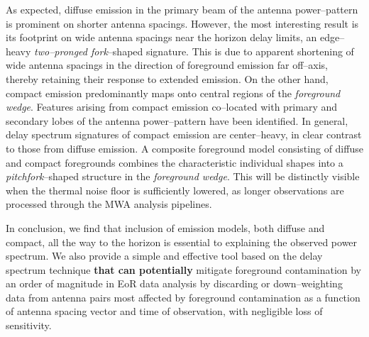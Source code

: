 \documentclass[preprint2,iop,numberedappendix]{emulateapj}
\begin{document}
As expected, diffuse emission in the primary beam of the antenna power--pattern is prominent on shorter antenna spacings. However, the most interesting result is its footprint on wide antenna spacings near the horizon delay limits, an edge--heavy {\it two--pronged fork}--shaped signature. This is due to apparent shortening of wide antenna spacings in the direction of foreground emission far off--axis, thereby retaining their response to extended emission. On the other hand, compact emission predominantly maps onto central regions of the {\it foreground wedge}. Features arising from compact emission co--located with primary and secondary lobes of the antenna power--pattern have been identified. In general, delay spectrum signatures of compact emission are center--heavy, in clear contrast to those from diffuse emission. A composite foreground model consisting of diffuse and compact foregrounds combines the characteristic individual shapes into a {\it pitchfork}--shaped structure in the {\it foreground wedge}. This will be distinctly visible when the thermal noise floor is sufficiently lowered, as longer observations are processed through the MWA analysis pipelines.

In conclusion, we find that inclusion of emission models, both diffuse and compact, all the way to the horizon is essential to explaining the observed power spectrum. We also provide a simple and effective tool based on the delay spectrum technique {\bf that can potentially} mitigate foreground contamination by an order of magnitude in EoR data analysis by discarding or down--weighting data from antenna pairs most affected by foreground contamination as a function of antenna spacing vector and time of observation, with negligible loss of sensitivity.

\acknowledgments
\end{document}
